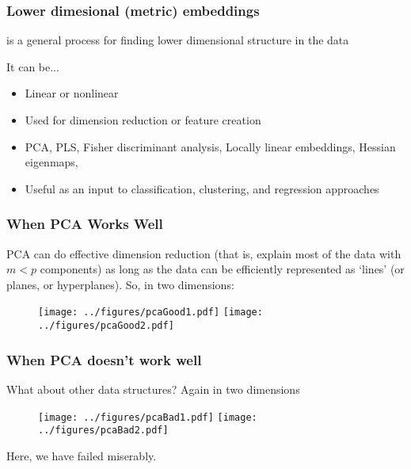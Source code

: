 \documentclass{beamer}
\begin{document}
\title{}
\subtitle{\classTitle}
\date{}



\begin{frame}
\maketitle
%
\organization
%
\end{frame}

\begin{frame}
  \frametitle{Lower dimesional (metric) embeddings}
   is a general process for finding lower
  dimensional structure in the data

  \vsp
It can be...
  \begin{itemize}
  \item Linear or nonlinear
  \item Used for dimension reduction or feature creation
  \item PCA, PLS, Fisher discriminant analysis, Locally
    linear embeddings, Hessian eigenmaps, 
  \item Useful as an input to classification, clustering, and regression approaches
  \end{itemize}
\end{frame}

\begin{frame}[fragile]
  \frametitle{When PCA Works Well}
PCA can do effective dimension reduction
(that is, explain most of the data with $m < p$ components) as long as the data can be efficiently represented as
  `lines' (or planes, or hyperplanes). 
  So, in two dimensions:
  \begin{figure}
    \centering
    \texttt{[image: ../figures/pcaGood1.pdf]}
    \texttt{[image: ../figures/pcaGood2.pdf]}    
  \end{figure}
\end{frame}

\begin{frame}
  \frametitle{When PCA doesn't work well}
  What about other data structures?  Again in two dimensions
  \begin{figure}
    \centering
    \texttt{[image: ../figures/pcaBad1.pdf]}
    \texttt{[image: ../figures/pcaBad2.pdf]}    
  \end{figure}
  Here, we have failed miserably.  
  \end{frame}
\end{document}

